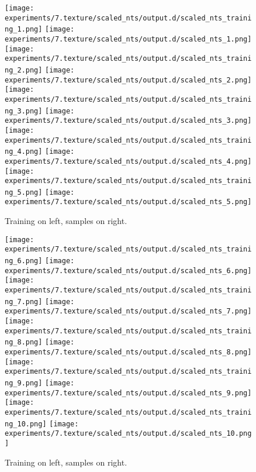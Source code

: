 
\begin{figure}
\texttt{[image: experiments/7.texture/scaled\_nts/output.d/scaled\_nts\_training\_1.png]}
\hfill
\texttt{[image: experiments/7.texture/scaled\_nts/output.d/scaled\_nts\_1.png]}
\\\vspace{3\baselineskip}
\texttt{[image: experiments/7.texture/scaled\_nts/output.d/scaled\_nts\_training\_2.png]}
\hfill
\texttt{[image: experiments/7.texture/scaled\_nts/output.d/scaled\_nts\_2.png]}
\\\vspace{3\baselineskip}
\texttt{[image: experiments/7.texture/scaled\_nts/output.d/scaled\_nts\_training\_3.png]}
\hfill
\texttt{[image: experiments/7.texture/scaled\_nts/output.d/scaled\_nts\_3.png]}
\\\vspace{3\baselineskip}
\texttt{[image: experiments/7.texture/scaled\_nts/output.d/scaled\_nts\_training\_4.png]}
\hfill
\texttt{[image: experiments/7.texture/scaled\_nts/output.d/scaled\_nts\_4.png]}
\\\vspace{3\baselineskip}
\texttt{[image: experiments/7.texture/scaled\_nts/output.d/scaled\_nts\_training\_5.png]}
\hfill
\texttt{[image: experiments/7.texture/scaled\_nts/output.d/scaled\_nts\_5.png]}
\caption{Training on left, samples on right.}
\end{figure}

\begin{figure}
\texttt{[image: experiments/7.texture/scaled\_nts/output.d/scaled\_nts\_training\_6.png]}
\hfill
\texttt{[image: experiments/7.texture/scaled\_nts/output.d/scaled\_nts\_6.png]}
\\\vspace{3\baselineskip}
\texttt{[image: experiments/7.texture/scaled\_nts/output.d/scaled\_nts\_training\_7.png]}
\hfill
\texttt{[image: experiments/7.texture/scaled\_nts/output.d/scaled\_nts\_7.png]}
\\\vspace{3\baselineskip}
\texttt{[image: experiments/7.texture/scaled\_nts/output.d/scaled\_nts\_training\_8.png]}
\hfill
\texttt{[image: experiments/7.texture/scaled\_nts/output.d/scaled\_nts\_8.png]}
\\\vspace{3\baselineskip}
\texttt{[image: experiments/7.texture/scaled\_nts/output.d/scaled\_nts\_training\_9.png]}
\hfill
\texttt{[image: experiments/7.texture/scaled\_nts/output.d/scaled\_nts\_9.png]}
\\\vspace{3\baselineskip}
\texttt{[image: experiments/7.texture/scaled\_nts/output.d/scaled\_nts\_training\_10.png]}
\hfill
\texttt{[image: experiments/7.texture/scaled\_nts/output.d/scaled\_nts\_10.png]}
\caption{Training on left, samples on right.}
\end{figure}

